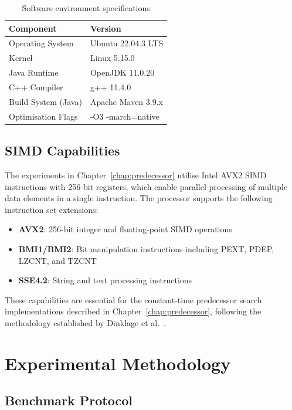 \begin{table}[H]
\centering
\begin{tabular}{|l|l|}
\hline
\textbf{Component} & \textbf{Version} \\
\hline
Operating System & Ubuntu 22.04.3 LTS \\
Kernel & Linux 5.15.0 \\
Java Runtime & OpenJDK 11.0.20 \\
C++ Compiler & g++ 11.4.0 \\
Build System (Java) & Apache Maven 3.9.x \\
Optimisation Flags & -O3 -march=native \\
\hline
\end{tabular}
\caption{Software environment specifications}
\label{tab:software}
\end{table}

\subsection{SIMD Capabilities}

The experiments in Chapter~\ref{chap:predecessor} utilise Intel AVX2 SIMD instructions with 256-bit registers, which enable parallel processing of multiple data elements in a single instruction. The processor supports the following instruction set extensions:
\begin{itemize}
    \item \textbf{AVX2}: 256-bit integer and floating-point SIMD operations
    \item \textbf{BMI1/BMI2}: Bit manipulation instructions including PEXT, PDEP, LZCNT, and TZCNT
    \item \textbf{SSE4.2}: String and text processing instructions
\end{itemize}

These capabilities are essential for the constant-time predecessor search implementations described in Chapter~\ref{chap:predecessor}, following the methodology established by Dinklage et al.~\cite{Patrick_2021}.

\section{Experimental Methodology}

\subsection{Benchmark Protocol}

